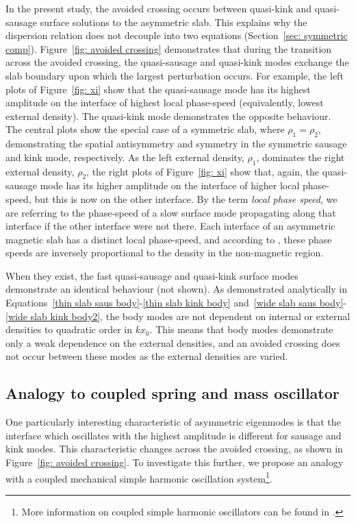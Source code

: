 \documentclass[12pt]{../style-files/ociamthesis}
\begin{document}
In the present study, the avoided crossing occurs between quasi-kink and quasi-sausage surface solutions to the asymmetric slab. This explains why the dispersion relation does not decouple into two equations (Section~\ref{sec: symmetric comp}). Figure~\ref{fig: avoided crossing} demonstrates that during the transition across the avoided crossing, the quasi-sausage and quasi-kink modes exchange the slab boundary upon which the largest perturbation occurs. For example, the left plots of Figure~\ref{fig: xi} show that the quasi-sausage mode has its highest amplitude on the interface of highest local phase-speed (equivalently, lowest external density). The quasi-kink mode demonstrates the opposite behaviour. The central plots show the special case of a symmetric slab, where $\rho_1 = \rho_2$, demonstrating the spatial antisymmetry and symmetry in the symmetric sausage and kink mode, respectively. As the left external density, $\rho_1$, dominates the right external density, $\rho_2$, the right plots of Figure~\ref{fig: xi} show that, again, the quasi-sausage mode has its higher amplitude on the interface of higher local phase-speed, but this is now on the other interface. By the term \textit{local phase speed}, we are referring to the phase-speed of a slow surface mode propagating along that interface if the other interface were not there. Each interface of an asymmetric magnetic slab has a distinct local phase-speed, and according to \cite{rob81a}, these phase speeds are inversely proportional to the density in the non-magnetic region.

When they exist, the fast quasi-sausage and quasi-kink surface modes demonstrate an identical behaviour (not shown). As demonstrated analytically in Equations~\eqref{thin slab saus body}-\eqref{thin slab kink body} and~\eqref{wide slab saus body}-\eqref{wide slab kink body2}, the body modes are not dependent on internal or external densities to quadratic order in $kx_0$. This means that body modes demonstrate only a weak dependence on the external densities, and an avoided crossing does not occur between these modes as the external densities are varied.


\subsection{Analogy to coupled spring and mass oscillator}
One particularly interesting characteristic of asymmetric eigenmodes is that the interface which oscillates with the highest amplitude is different for sausage and kink modes. This characteristic changes across the avoided crossing, as shown in Figure~\eqref{fig: avoided crossing}. To investigate this further, we propose an analogy with a coupled mechanical simple harmonic oscillation system\footnote{More information on coupled simple harmonic oscillators can be found in \cite{nov10}.}.
\end{document}
